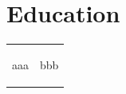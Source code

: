 \documentclass[
    a4paper,
    oneside,
    10pt
]{article}
\newenvironment{timeline}{%
	\renewcommand{\arraystretch}{1.2}%
	\begin{tabular}{c | c}%
}{%
	\end{tabular}%
}
\newcommand{\tldate}[1]{%
	\begin{minipage}{3cm}%
		\begin{flushright}%
			#1%
		\end{flushright}%
	\end{minipage}%
}
\newcommand{\tlcontent}[1]{%
	\begin{minipage}{\textwidth}%
		#1%
	\end{minipage}%
}
\begin{document}
    
    \section{Education}
    
    \begin{timeline}
    		\tldate{aaa} & \tlcontent{bbb} \\
    \end{timeline}
\end{document}
